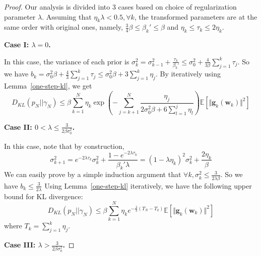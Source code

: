\documentclass[final,12pt]{colt2018} %
\begin{document}
\begin{proof}
Our analysis is divided into 3 cases based on choice of regularization parameter $\lambda$. Assuming that $\eta_k\lambda<0.5,\forall k$, the transformed parameters are at the same order with original ones, namely, $\frac{3}{4}\beta\leq\beta_k'\leq \beta$ and $\eta_k\leq\tau_k\leq 2\eta_k$.

\vspace{0.2cm}
\noindent\textbf{Case I: $\lambda=0$.}
\vspace{0.2cm}

In this case, the variance of each prior is $\sigma_k^2=\sigma_{k-1}^2+\frac{\tau_k}{\beta_k'}\leq \sigma_0^2+\frac{4}{3\beta}\sum_{j=1}^k \tau_j$. So we have $b_k=\sigma_0^2\beta+\frac{4}{3}\sum_{j=1}^k \tau_j\leq \sigma_0^2\beta+3\sum_{j=1}^k \eta_j$. By iteratively using Lemma~\ref{one-step-kl}, we get
\begin{equation}
  D_{KL}(p_N||\gamma_N)\leq \beta\sum_{k=1}^N \eta_k\exp\left( -\sum_{j=k+1}^N\frac{\eta_j}{2\sigma_0^2\beta+6\sum_{l=1}^j \eta_l}\right)\mathbb{E}\left[\Vert\bm{g}_k(\bm{w}_k)\Vert^2\right]
\end{equation}

\vspace{0.2cm}
\noindent\textbf{Case II: $0<\lambda\leq \frac{3}{2\beta\sigma_0^2}$.}
\vspace{0.2cm}

In this case, note that by construction,
$$\sigma_{k+1}^2=e^{-2\lambda \tau_k}\sigma_k^2+\frac{1-e^{-2\lambda \tau_k}}{\beta_k' \lambda}=(1-\lambda\eta_k)^2\sigma_k^2+\frac{2\eta_k}{\beta}$$
 We can easily prove by a simple induction argument that $\forall k,\sigma_k^2\leq \frac{3}{2\lambda\beta}$. So we have $b_k\leq\frac{3}{2\lambda}$ Using Lemma~\ref{one-step-kl} iteratively, we have the following upper bound for KL divergence:
\begin{equation}
  D_{KL}(p_N||\gamma_N)\leq \beta\sum_{k=1}^N \eta_k e^{-\frac{\lambda}{3}(T_N-T_k)}\mathbb{E}\left[\Vert\bm{g}_k(\bm{w}_k)\Vert^2\right]
\end{equation}
where $T_{k}=\sum_{j=1}^k \eta_j$.

\vspace{0.2cm}
\noindent\textbf{Case III: $\lambda> \frac{3}{2\beta\sigma_0^2}$.}
\vspace{0.2cm}


\end{proof}
\end{document}
